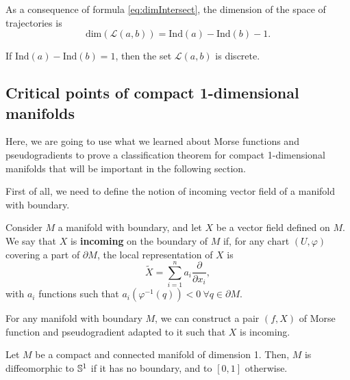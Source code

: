 \begin{rmrk}
As a consequence of formula \ref{eq:dimIntersect}, the dimension of the space of trajectories is
\begin{displaymath}
\text{dim}(\mathcal{L}(a,b)) = \text{Ind}(a) - \text{Ind}(b) - 1 .
\end{displaymath}
\end{rmrk}

\begin{coro}
If $\text{Ind}(a)-\text{Ind}(b) = 1$, then the set $\mathcal{L}(a,b)$ is discrete.
\end{coro}

\subsection{Critical points of compact 1-dimensional manifolds}

Here, we are going to use what we learned about Morse functions and pseudogradients to prove a classification theorem for compact 1-dimensional manifolds that will be important in the following section.

First of all, we need to define the notion of incoming vector field of a manifold with boundary.

\begin{deff}
Consider $M$ a manifold with boundary, and let $X$ be a vector field defined on $M$. We say that $X$ is {\bf incoming} on the boundary of $M$ if, for any chart $(U,\varphi)$ covering a part of $\partial M$, the local representation of $X$ is
$$\tilde{X} = \sum_{i=1}^n a_i \frac{\partial}{\partial x_i} ,$$
with $a_i$ functions such that $a_i(\varphi^{-1}(q)) < 0 \ \forall q \in \partial M$.
\end{deff}

\begin{lema} \label{incomingadapted}
For any manifold with boundary $M$, we can construct a pair $(f,X)$ of Morse function and pseudogradient adapted to it such that $X$ is incoming.
\end{lema}

\begin{theo} \label{1dimensional}
Let $M$ be a compact and connected manifold of dimension 1. Then, $M$ is diffeomorphic to $\mathbb{S}^1$ if it has no boundary, and to $[0,1]$ otherwise.
\end{theo}

